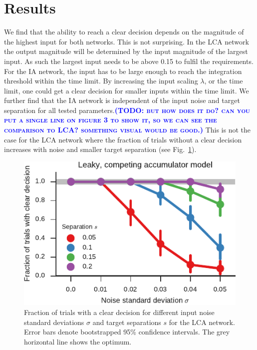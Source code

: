 \documentclass[10pt,letterpaper]{article}
\makeatletter
\newcommand{\todo}[1]{\textbf{\textsc{\textcolor{blue}{(TODO\@: #1)}}}}
\makeatother
\begin{document}
\section{Results}
We find that the ability to reach a clear decision depends on the magnitude of the highest input for both networks.
This is not surprising.
In the LCA network the output magnitude will be determined by the input magnitude of the largest input.
As such the largest input needs to be above 0.15 to fulfil the requirements.
For the IA network, the input has to be large enough to reach the integration threshold within the time limit.
By increasing the input scaling $\lambda$, or the time limit, one could get a clear decision for smaller inputs within the time limit.
We further find that the IA network is independent of the input noise and target separation for all tested parameters.\todo{but how does it do? can you put a single line on figure 3 to show it, so we can see the comparison to LCA? something visual would be good.}
This is not the case for the LCA network where the fraction of trials without a clear decision increases with noise and smaller target separation (see Fig.~\ref{fig:decisions}).
\begin{figure}
    \centering
    \includegraphics{figures/decisions}
    \caption{
        Fraction of trials with a clear decision for different input noise standard deviations $\sigma$ and target separations $s$ for the LCA network.
        Error bars denote bootstrapped 95\% confidence intervals.
        The grey horizontal line shows the optimum.
    }\label{fig:decisions}
\end{figure}
\end{document}
